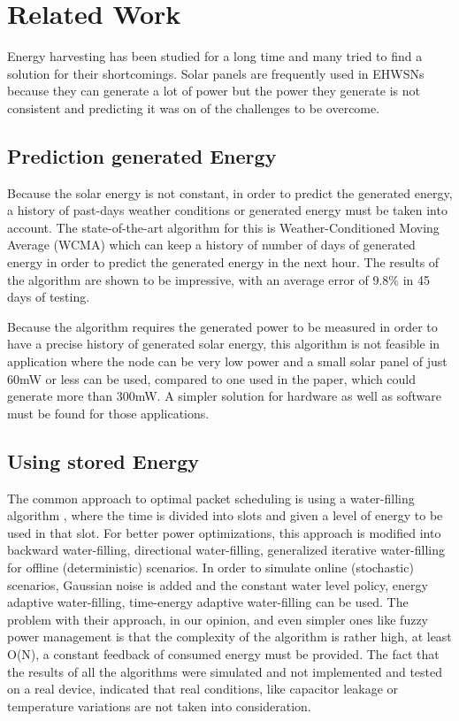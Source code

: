 \normalfont\normalsize
\chapter{Related Work}
\label{chap:related}

Energy harvesting has been studied for a long time and many tried to find a solution for their
shortcomings. Solar panels are frequently used in EHWSNs because they can generate a lot of power
but the power they generate is not consistent and predicting it was on of the challenges to be
overcome.

\section {Prediction generated Energy}

Because the solar energy is not constant, in order to predict the generated energy, a history of
past-days weather conditions or generated energy must be taken into account. The state-of-the-art
algorithm for this is Weather-Conditioned Moving Average (WCMA) \cite{piorno2009prediction} which
can keep a history of number of days of generated energy in order to predict the generated energy
in the next hour. The results of the algorithm are shown to be impressive, with an average error of
9.8\% in 45 days of testing.

Because the algorithm requires the generated power to be measured in order to have a precise
history of generated solar energy, this algorithm is not feasible in application where the node
can be very low power and a small solar panel of just 60mW or less can be used, compared to one
used in the paper, which could generate more than 300mW. A simpler solution for hardware as well as
software must be found for those applications.


\section {Using stored Energy}

The common approach to optimal packet scheduling is using a water-filling algorithm
\cite{yang2012optimal} \cite{huan2013utility}, where the time
is divided into slots and given a level of energy to be used in that slot. For better power
optimizations, this approach is modified into backward water-filling, directional water-filling,
generalized iterative water-filling \cite{want2015iterative} for offline (deterministic) scenarios. In order to simulate
online (stochastic) scenarios, Gaussian noise is added and the constant water level policy, energy
adaptive water-filling\cite{ozel2012optimal}, time-energy adaptive water-filling\cite{ozel2011transimision} can be used.
The problem with their approach, in our opinion, and even simpler ones like fuzzy power management
\cite{aoudia2016fuzzy} is that the complexity of the algorithm is rather high, at least O(N), a
constant feedback of consumed energy must be provided. The fact that the results of all the
algorithms were simulated and not implemented and tested on a real device, indicated that real
conditions, like capacitor leakage or temperature variations are not taken into consideration.


